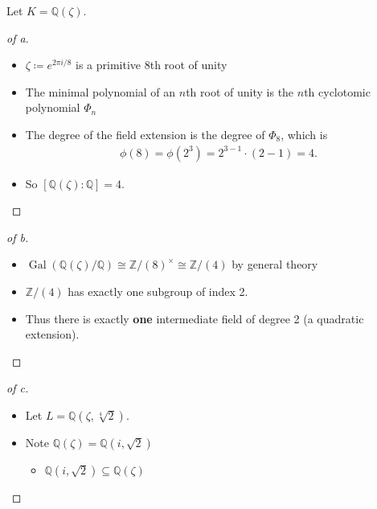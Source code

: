 \begin{solution}

\envlist

Let \(K = {\mathbb{Q}}(\zeta)\).

\begin{proof}[of a]

\envlist

\begin{itemize}
\tightlist
\item
  \(\zeta \coloneqq e^{2\pi i / 8}\) is a primitive \(8\)th root of
  unity
\item
  The minimal polynomial of an \(n\)th root of unity is the \(n\)th
  cyclotomic polynomial \(\Phi_n\)
\item
  The degree of the field extension is the degree of \(\Phi_8\), which
  is
  \begin{align*}
  \phi(8) = \phi(2^3) = 2^{3-1} \cdot (2-1) = 4
  .\end{align*}
\item
  So \([{\mathbb{Q}}(\zeta): {\mathbb{Q}}] = 4\).
\end{itemize}

\end{proof}

\begin{proof}[of b]

\envlist

\begin{itemize}
\tightlist
\item
  \(\operatorname{Gal}({\mathbb{Q}}(\zeta)/{\mathbb{Q}}) \cong {\mathbb{Z}}/(8)^{\times}\cong {\mathbb{Z}}/(4)\)
  by general theory
\item
  \({\mathbb{Z}}/(4)\) has exactly one subgroup of index 2.
\item
  Thus there is exactly \textbf{one} intermediate field of degree 2 (a
  quadratic extension).
\end{itemize}

\end{proof}

\begin{proof}[of c]

\envlist

\begin{itemize}
\item
  Let \(L = {\mathbb{Q}}(\zeta, \sqrt[4] 2)\).
\item
  Note \({\mathbb{Q}}(\zeta) = {\mathbb{Q}}(i, \sqrt 2)\)

  \begin{itemize}
  \tightlist
  \item
    \({\mathbb{Q}}(i, \sqrt{2})\subseteq {\mathbb{Q}}(\zeta)\)


\end{itemize}
\end{itemize}
\end{proof}
\end{solution}
